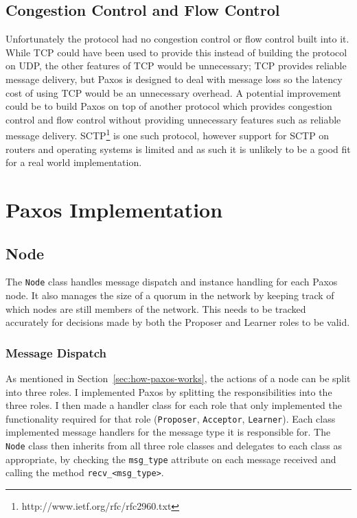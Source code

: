 \documentclass[12pt,twoside,notitlepage]{report}
\begin{document}
\subsection{Congestion Control and Flow Control}

Unfortunately the protocol had no congestion control or flow control built into it.
While TCP could have been used to provide this instead of building the protocol on UDP, the other
features of TCP would be unnecessary; TCP provides reliable message delivery, but Paxos is
designed to deal with message loss so the latency cost of using TCP would be an unnecessary
overhead.  A potential improvement could be to build Paxos on top of another protocol which
provides congestion control and flow control without providing unnecessary features such as
reliable message delivery. SCTP\footnote{http://www.ietf.org/rfc/rfc2960.txt} is one such
protocol, however support for SCTP on routers and operating systems is limited and as such it is
unlikely to be a good fit for a real world implementation.

\section{Paxos Implementation}

\subsection{Node}

The \verb+Node+ class handles message dispatch and instance handling for each Paxos node. It also
manages the size of a quorum in the network by keeping track of which nodes are still members of
the network. This needs to be tracked accurately for decisions made by both the Proposer and
Learner roles to be valid.

\subsubsection{Message Dispatch}

As mentioned in Section~\ref{sec:how-paxos-works}, the actions of a node can be split into three
roles. I implemented Paxos by splitting the responsibilities into the three roles. I then made a
handler class for each role that only implemented the functionality required for that role
(\verb+Proposer+, \verb+Acceptor+, \verb+Learner+). Each class implemented message handlers for
the message type it is responsible for. The \verb+Node+ class then inherits from all three role
classes and delegates to each class as appropriate, by checking the \verb+msg_type+ attribute on
each message received and calling the method \verb+recv_<msg_type>+.
\end{document}
